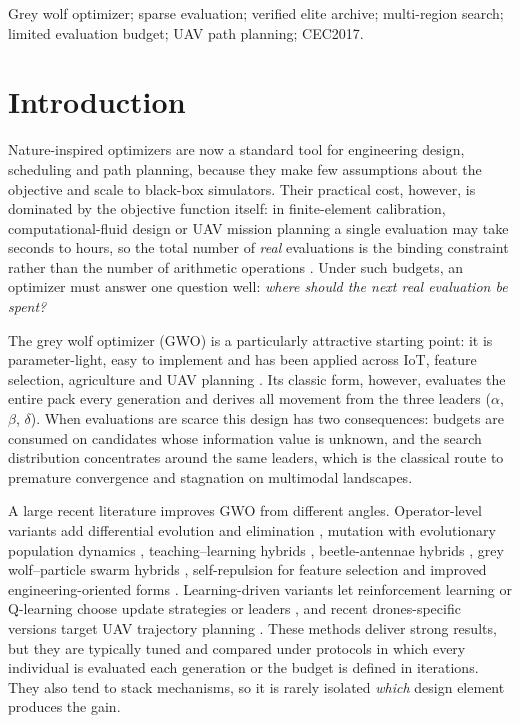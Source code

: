 \documentclass[journal]{IEEEtran}
\begin{document}
\begin{IEEEkeywords}
Grey wolf optimizer; sparse evaluation; verified elite archive; multi-region
search; limited evaluation budget; UAV path planning; CEC2017.
\end{IEEEkeywords}

\section{Introduction}
Nature-inspired optimizers are now a standard tool for engineering design,
scheduling and path planning, because they make few assumptions about the
objective and scale to black-box simulators. Their practical cost, however,
is dominated by the objective function itself: in finite-element calibration,
computational-fluid design or UAV mission planning a single evaluation may
take seconds to hours, so the total number of \emph{real} evaluations is the
binding constraint rather than the number of arithmetic operations
\cite{yu2021multimodel,liu2024survey,zhao2025surrogate}. Under such budgets,
an optimizer must answer one question well: \emph{where should the next real
evaluation be spent?}

The grey wolf optimizer (GWO) \cite{mirjalili2014gwo} is a particularly
attractive starting point: it is parameter-light, easy to implement and has
been applied across IoT, feature selection, agriculture and UAV planning
\cite{nadimishahraki2024iot,makhadmeh2023review}. Its classic form, however,
evaluates the entire pack every generation and derives all movement from the
three leaders ($\alpha$, $\beta$, $\delta$). When evaluations are scarce this
design has two consequences: budgets are consumed on candidates whose
information value is unknown, and the search distribution concentrates
around the same leaders, which is the classical route to premature
convergence and stagnation on multimodal landscapes.

A large recent literature improves GWO from different angles. Operator-level
variants add differential evolution and elimination
\cite{wang2019igwode}, mutation with evolutionary population dynamics
\cite{zhang2025mutation}, teaching--learning hybrids \cite{singh2025tlbo},
beetle-antennae hybrids \cite{zhang2025bagwo}, grey wolf--particle swarm
hybrids \cite{shaikh2025hybrid}, self-repulsion for feature selection
\cite{wang2025selfrepulsion} and improved engineering-oriented forms
\cite{li2021sustainability}. Learning-driven variants let reinforcement
learning or Q-learning choose update strategies or leaders
\cite{yin2026amsgwo,huang2026qlfdgwo,khalid2026aogwo,wang2026dmsgwo}, and
recent drones-specific versions target UAV trajectory planning
\cite{nayeem2025drones,jia2025drones}. These methods deliver strong results,
but they are typically tuned and compared under protocols in which every
individual is evaluated each generation or the budget is defined in
iterations. They also tend to stack mechanisms, so it is rarely isolated
\emph{which} design element produces the gain.
\end{document}
